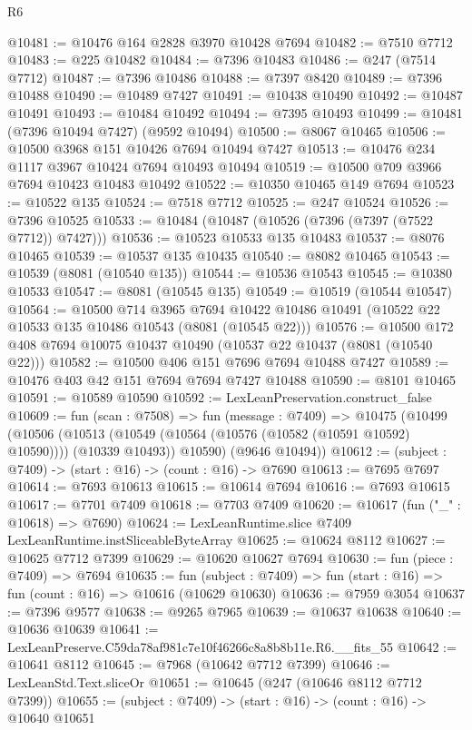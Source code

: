 \begin{lexlean}{R6}
\begin{coremodule}
@10481 := @10476 @164 @2828 @3970 @10428 @7694
@10482 := @7510 @7712
@10483 := @225 @10482
@10484 := @7396 @10483
@10486 := @247 (@7514 @7712)
@10487 := @7396 @10486
@10488 := @7397 @8420
@10489 := @7396 @10488
@10490 := @10489 @7427
@10491 := @10438 @10490
@10492 := @10487 @10491
@10493 := @10484 @10492
@10494 := @7395 @10493
@10499 := @10481 (@7396 @10494 @7427) (@9592 @10494)
@10500 := @8067 @10465
@10506 := @10500 @3968 @151 @10426 @7694 @10494 @7427
@10513 := @10476 @234 @1117 @3967 @10424 @7694 @10493 @10494
@10519 := @10500 @709 @3966 @7694 @10423 @10483 @10492
@10522 := @10350 @10465 @149 @7694
@10523 := @10522 @135
@10524 := @7518 @7712
@10525 := @247 @10524
@10526 := @7396 @10525
@10533 := @10484 (@10487 (@10526 (@7396 (@7397 (@7522 @7712)) @7427)))
@10536 := @10523 @10533 @135 @10483
@10537 := @8076 @10465
@10539 := @10537 @135 @10435
@10540 := @8082 @10465
@10543 := @10539 (@8081 (@10540 @135))
@10544 := @10536 @10543
@10545 := @10380 @10533
@10547 := @8081 (@10545 @135)
@10549 := @10519 (@10544 @10547)
@10564 := @10500
    @714
    @3965
    @7694
    @10422
    @10486
    @10491
    (@10522 @22 @10533 @135 @10486 @10543 (@8081 (@10545 @22)))
@10576 := @10500 @172 @408 @7694 @10075 @10437 @10490 (@10537 @22 @10437 (@8081 (@10540 @22)))
@10582 := @10500 @406 @151 @7696 @7694 @10488 @7427
@10589 := @10476 @403 @42 @151 @7694 @7694 @7427 @10488
@10590 := @8101 @10465
@10591 := @10589 @10590
@10592 := LexLeanPreservation.construct_false
@10609 := fun (scan : @7508) =>
  fun (message : @7409) =>
  @10475
    (@10499
      (@10506
        (@10513 (@10549 (@10564 (@10576 (@10582 (@10591 @10592) @10590)))) (@10339 @10493))
        @10590)
      (@9646 @10494))
@10612 := (subject : @7409) -> (start : @16) -> (count : @16) -> @7690
@10613 := @7695 @7697
@10614 := @7693 @10613
@10615 := @10614 @7694
@10616 := @7693 @10615
@10617 := @7701 @7409
@10618 := @7703 @7409
@10620 := @10617 (fun ("_" : @10618) => @7690)
@10624 := LexLeanRuntime.slice @7409 LexLeanRuntime.instSliceableByteArray
@10625 := @10624 @8112
@10627 := @10625 @7712 @7399
@10629 := @10620 @10627 @7694
@10630 := fun (piece : @7409) => @7694
@10635 := fun (subject : @7409) => fun (start : @16) => fun (count : @16) => @10616 (@10629 @10630)
@10636 := @7959 @3054
@10637 := @7396 @9577
@10638 := @9265 @7965
@10639 := @10637 @10638
@10640 := @10636 @10639
@10641 := LexLeanPreserve.C59da78af981c7e10f46266c8a8b8b11e.R6.__fits_55
@10642 := @10641 @8112
@10645 := @7968 (@10642 @7712 @7399)
@10646 := LexLeanStd.Text.sliceOr
@10651 := @10645 (@247 (@10646 @8112 @7712 @7399))
@10655 := (subject : @7409) -> (start : @16) -> (count : @16) -> @10640 @10651

\end{coremodule}
\end{lexlean}

